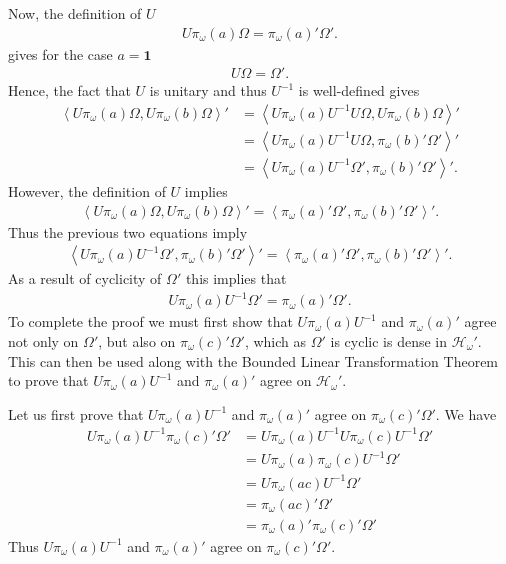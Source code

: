 Now, the definition of $U$
\begin{align}
    U\pi_\omega(a)\Omega = \pi_\omega(a)'\Omega'.
\end{align}
gives for the case $a = \mathbf{1}$
\begin{align}
    U\Omega = \Omega'.
\end{align}
Hence, the fact that $U$ is unitary and thus $U^{-1}$ is well-defined gives
\begin{align}
    \left< U\pi_\omega(a)\Omega, U\pi_\omega(b)\Omega \right>' &= \left< U\pi_\omega(a)U^{-1}U\Omega, U\pi_\omega(b)\Omega \right>' \\
                                                               &= \left< U\pi_\omega(a)U^{-1}U\Omega, \pi_\omega(b)'\Omega' \right>' \\
                                                               &= \left< U\pi_\omega(a)U^{-1}\Omega', \pi_\omega(b)'\Omega' \right>'.
\end{align}
However, the definition of $U$ implies
\begin{align}
    \left< U\pi_\omega(a)\Omega, U\pi_\omega(b)\Omega \right>' = \left<\pi_\omega(a)'\Omega', \pi_\omega(b)'\Omega'\right>'.
\end{align}
Thus the previous two equations imply
\begin{align}
    \left< U\pi_\omega(a)U^{-1}\Omega', \pi_\omega(b)'\Omega' \right>' = \left<\pi_\omega(a)'\Omega', \pi_\omega(b)'\Omega'\right>'.
\end{align}
As a result of cyclicity of $\Omega'$ this implies that
\begin{align}
    U\pi_\omega(a)U^{-1}\Omega' = \pi_\omega(a)'\Omega'.
\end{align}
To complete the proof we must first show that $U\pi_\omega(a)U^{-1}$ and $\pi_\omega(a)'$ agree not only on $\Omega'$, but also on $\pi_\omega(c)'\Omega'$, which as $\Omega'$ is cyclic is dense in $\mathcal{H}_\omega'$. This can then be used along with the Bounded Linear Transformation Theorem to prove that $U\pi_\omega(a)U^{-1}$ and $\pi_\omega(a)'$ agree on $\mathcal{H}_\omega'$.

Let us first prove that $U\pi_\omega(a)U^{-1}$ and $\pi_\omega(a)'$ agree on $\pi_\omega(c)'\Omega'$. We have
\begin{align}
    U\pi_\omega(a)U^{-1} \pi_\omega(c)'\Omega' &= U\pi_\omega(a)U^{-1} U\pi_\omega(c)U^{-1} \Omega' \\
                                               &= U\pi_\omega(a)\pi_\omega(c)U^{-1} \Omega' \\
                                               &= U\pi_\omega(ac)U^{-1} \Omega' \\
                                               &= \pi_\omega(ac)' \Omega' \\
                                               &= \pi_\omega(a)'\pi_\omega(c)' \Omega'
\end{align}
Thus $U\pi_\omega(a)U^{-1}$ and $\pi_\omega(a)'$ agree on $\pi_\omega(c)'\Omega'$.

